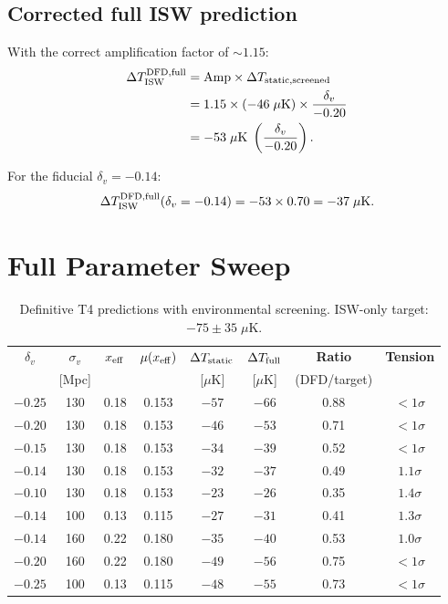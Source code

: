 \documentclass[11pt,a4paper]{article}
\newcommand{\mufd}{\mu}
\begin{document}
\subsection{Corrected full ISW prediction}

With the correct amplification factor of $\sim 1.15$:
\begin{align}
\Delta T_{\rm ISW}^{\rm DFD,full}
&= \text{Amp}\times\Delta T_{\rm static,screened}
\nonumber\\
&= 1.15 \times \left(-46\;\mu\text{K}\right)
\times\frac{\delta_v}{-0.20}
\nonumber\\
&= -53\;\mu\text{K}\;\left(\frac{\delta_v}{-0.20}\right).
\label{eq:ISW-full}
\end{align}

For the fiducial $\delta_v = -0.14$:
\begin{equation}
\Delta T_{\rm ISW}^{\rm DFD,full}(\delta_v = -0.14)
= -53 \times 0.70 = -37\;\mu\text{K}.
\end{equation}


\section{Full Parameter Sweep}
\label{sec:parameter-sweep}

\begin{table}[H]
\centering
\caption{Definitive T4 predictions with environmental screening.
ISW-only target: $-75 \pm 35\;\mu$K.}
\label{tab:T4-definitive}
\begin{tabular}{cccccccc}
\toprule
$\delta_v$ & $\sigma_v$ & $x_{\rm eff}$ & $\mufd(x_{\rm eff})$
& $\Delta T_{\rm static}$ & $\Delta T_{\rm full}$ &
\textbf{Ratio} & \textbf{Tension} \\
& [Mpc] & & & [$\mu$K] & [$\mu$K] & (DFD/target) & \\
\midrule
$-0.25$ & 130 & 0.18 & 0.153 & $-57$ & $-66$ & 0.88 & $< 1\sigma$ \\
$-0.20$ & 130 & 0.18 & 0.153 & $-46$ & $-53$ & 0.71 & $< 1\sigma$ \\
$-0.15$ & 130 & 0.18 & 0.153 & $-34$ & $-39$ & 0.52 & $< 1\sigma$ \\
$-0.14$ & 130 & 0.18 & 0.153 & $-32$ & $-37$ & 0.49 & $1.1\sigma$ \\
$-0.10$ & 130 & 0.18 & 0.153 & $-23$ & $-26$ & 0.35 & $1.4\sigma$ \\
\midrule
$-0.14$ & 100 & 0.13 & 0.115 & $-27$ & $-31$ & 0.41 & $1.3\sigma$ \\
$-0.14$ & 160 & 0.22 & 0.180 & $-35$ & $-40$ & 0.53 & $1.0\sigma$ \\
$-0.20$ & 160 & 0.22 & 0.180 & $-49$ & $-56$ & 0.75 & $< 1\sigma$ \\
$-0.25$ & 100 & 0.13 & 0.115 & $-48$ & $-55$ & 0.73 & $< 1\sigma$ \\
\bottomrule
\end{tabular}
\end{table}
\end{document}

